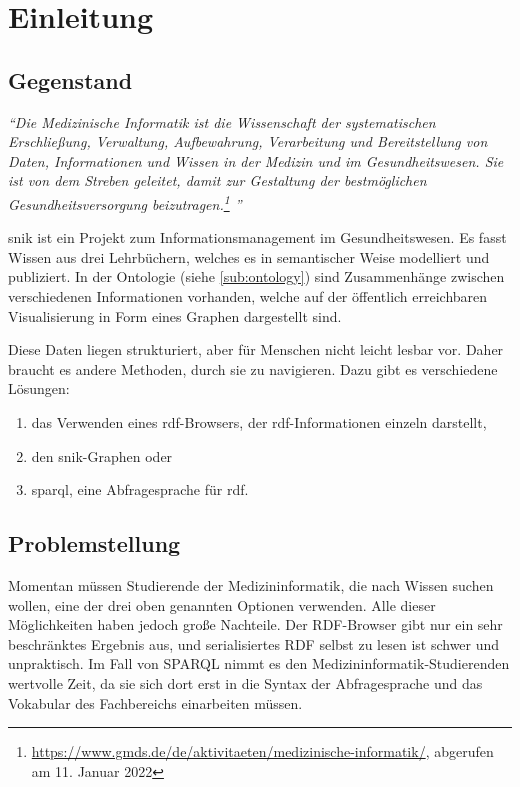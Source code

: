\chapter{Einleitung}\label{ch:introduction}

\section{Gegenstand}
\begin{flushright}{\slshape
\enquote{Die Medizinische Informatik ist die Wissenschaft der systematischen Erschließung, Verwaltung, Aufbewahrung, Verarbeitung und Bereitstellung von Daten, Informationen und Wissen in der Medizin und im Gesundheitswesen.
Sie ist von dem Streben geleitet, damit zur Gestaltung der bestmöglichen Gesundheitsversorgung beizutragen.\footnote{\url{https://www.gmds.de/de/aktivitaeten/medizinische-informatik/}, abgerufen am 11. Januar 2022}
}}
\end{flushright}
\ac{snik} ist ein Projekt zum Informationsmanagement im Gesundheitswesen.
Es fasst Wissen aus drei Lehrbüchern, welches es in semantischer Weise modelliert und publiziert.
In der Ontologie (siehe \cref{sub:ontology}) sind Zusammenhänge zwischen verschiedenen Informationen vorhanden,
welche auf der öffentlich erreichbaren Visualisierung in Form eines Graphen dargestellt sind.

Diese Daten liegen strukturiert, aber für Menschen nicht leicht lesbar vor.
Daher braucht es andere Methoden, durch sie zu navigieren.
Dazu gibt es verschiedene Lösungen:
\begin{enumerate}
	\item das Verwenden eines \acs{rdf}-Browsers, der \acs{rdf}-Informationen einzeln darstellt,
	\item den \ac{snik}-Graphen oder
	\item \acs{sparql}, eine Abfragesprache für \acs{rdf}.
\end{enumerate}

\section{Problemstellung}\label{sec:problemstellung}

Momentan müssen Studierende der Medizininformatik, die nach Wissen suchen wollen, eine der drei oben genannten Optionen verwenden.
Alle dieser Möglichkeiten haben jedoch große Nachteile.
Der RDF-Browser gibt nur ein sehr beschränktes Ergebnis aus, und serialisiertes RDF selbst zu lesen ist schwer und unpraktisch.
Im Fall von SPARQL nimmt es den Medizininformatik-Studierenden wertvolle Zeit, da sie sich dort erst in die Syntax der Abfragesprache und das Vokabular des Fachbereichs einarbeiten müssen.

